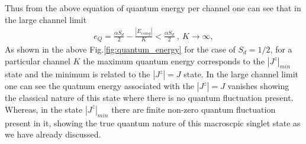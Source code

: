 \documentclass[reprint,prb,superscriptaddress]{revtex4-2}
\begin{document}
Thus from the above equation of quantum energy per channel one can see that in the large channel limit 
\begin{eqnarray}
e_Q = \frac{\alpha S_d}{2}- \frac{|E_{ising}|}{K} < \frac{\alpha S_d}{2}~,~K\rightarrow \infty, 
\end{eqnarray}
As shown in the above Fig.\ref{fig:quantum_energy} for the case of $S_d=1/2$, for a particular channel $K$ the maximum quantum energy corresponds to the $|J^z|_{min}$ state and the minimum is related to the $|J^z|=J$ state. In the large channel limit one can see the quatnum energy associated with the $|J^z|=J$ vanishes showing the classical nature of this state where there is no quantum fluctuation present. Whereas, in the state $|J^z|_{min}$ there are finite non-zero quantum fluctuation present in it, showing the true quantum nature of this macroscpic singlet state as we have already discussed.
\end{document}
